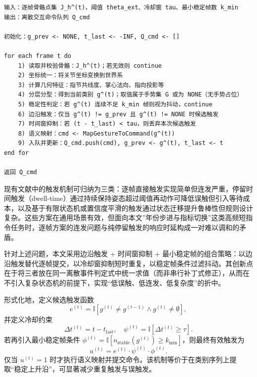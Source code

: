 \begin{lstlisting}[caption={基于深度骨骼约束的手势交互伪代码},label={lst:gesture_pipeline},captionpos=t]
输入：逐帧骨骼点集 J_h^(t)，阈值 theta_ext、冷却窗 tau、最小稳定帧数 k_min
输出：离散交互命令队列 Q_cmd

初始化：g_prev <- NONE, t_last <- -INF, Q_cmd <- []

for each frame t do
    1) 读取并校验骨骼：J_h^(t)；若无效则 continue
    2) 坐标统一：将关节坐标变换到世界系
    3) 计算几何特征：指节共线度、掌心法向、指向投影等
    4) 分层分型：得到当前类别 g^(t)；取值属于手势集 G 或为 NONE（无手势占位）
    5) 稳定性判定：若 g^(t) 连续不足 k_min 帧则视为抖动，continue
    6) 边沿触发：仅当 g^(t) != g_prev 且 g^(t) != NONE 时候选触发
    7) 时间窗抑制：若 (t - t_last) < tau，则丢弃本次候选触发
    8) 语义映射：cmd <- MapGestureToCommand(g^(t))
    9) 入队并更新：Q_cmd.push(cmd), g_prev <- g^(t), t_last <- t
end for

返回 Q_cmd
\end{lstlisting}


现有文献中的触发机制可归纳为三类：逐帧直接触发实现简单但连发严重，停留时间触发（dwell-time）通过持续保持姿态超过阈值再动作可降低误触但引入等待成本，以及基于有限状态机或置信度平滑的触发通过状态迁移提升鲁棒性但规则设计复杂\cite{wang2026ar_io_survey,duarte2020gesture,dong2022}。这些方案在通用场景有效，但面向本文”年份步进与指标切换”这类高频短指令任务时，逐帧方案的连发问题与纯停留触发的响应时延构成一对难以调和的矛盾。

针对上述问题，本文采用边沿触发 + 时间窗抑制 + 最小稳定帧的组合策略：以边沿触发替代逐帧提交，以冷却窗抑制短时重复，以稳定帧条件过滤抖动。其创新点在于将三者放在同一离散事件判定式中统一求值（而非串行补丁式修正），从而在不引入复杂状态机的前提下，实现“低误触、低连发、低复杂度”的折中。

形式化地，定义候选触发函数
\begin{equation}
  e^{(t)}=\mathbb{I}\!\left[g^{(t)}\neq g^{(t-1)} \land g^{(t)}\neq\emptyset\right],
  \label{eq:gesture_edge}
\end{equation}
并定义冷却约束
\begin{equation}
  \Delta t^{(t)} = t-t_{\mathrm{last}},\quad
  \psi^{(t)}=\mathbb{I}\!\left[\Delta t^{(t)}\ge\tau\right].
  \label{eq:gesture_cooldown}
\end{equation}
若再引入最小稳定帧条件 $\phi^{(t)}=\mathbb{I}[n_{\mathrm{stable}}(g^{(t)})\ge k_{\min}]$，则最终有效触发为
\begin{equation}
  u^{(t)} = e^{(t)}\cdot \psi^{(t)}\cdot \phi^{(t)}.
  \label{eq:gesture_trigger_final}
\end{equation}
仅当 $u^{(t)}=1$ 时才执行语义映射并提交命令。该机制等价于在类别序列上提取“稳定上升沿”，可显著减少重复触发与误触发。


